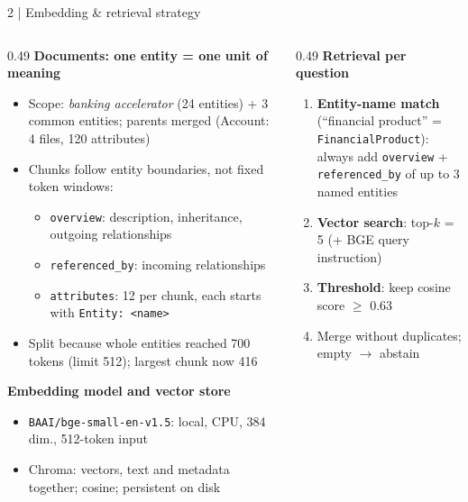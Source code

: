 \documentclass[aspectratio=169,10pt]{beamer}
\newcommand{\code}[1]{\texttt{#1}}
\begin{document}
\begin{frame}{2 \;|\; Embedding \& retrieval strategy}
\begin{columns}[T]
\begin{column}{0.49\textwidth}
\small\textbf{\color{accent}Documents: one entity = one unit of meaning}
\scriptsize
\begin{itemize}
  \item Scope: \emph{banking accelerator} (24 entities) + 3 common entities; parents merged (Account: 4 files, 120 attributes)
  \item Chunks follow entity boundaries, not fixed token windows:
  \begin{itemize}
    \item \code{overview}: description, inheritance, outgoing relationships
    \item \code{referenced\_by}: incoming relationships
    \item \code{attributes}: 12 per chunk, each starts with \code{Entity: <name>}
  \end{itemize}
  \item Split because whole entities reached 700 tokens (limit 512); largest chunk now 416
\end{itemize}

\vspace{1mm}
\small\textbf{\color{accent}Embedding model and vector store}
\scriptsize
\begin{itemize}
  \item \code{BAAI/bge-small-en-v1.5}: local, CPU, 384 dim., 512-token input
  \item Chroma: vectors, text and metadata together; cosine; persistent on disk
\end{itemize}
\end{column}

\begin{column}{0.49\textwidth}
\small\textbf{\color{accent}Retrieval per question}
\scriptsize
\begin{enumerate}
  \item \textbf{Entity-name match} (``financial product'' = \code{FinancialProduct}):\\
        always add \code{overview} + \code{referenced\_by} of up to 3 named entities
  \item \textbf{Vector search}: top-$k$ = 5 (+ BGE query instruction)
  \item \textbf{Threshold}: keep cosine score $\ge$ 0.63
  \item Merge without duplicates; empty $\rightarrow$ abstain
\end{enumerate}


\end{column}
\end{columns}
\end{frame}
\end{document}
